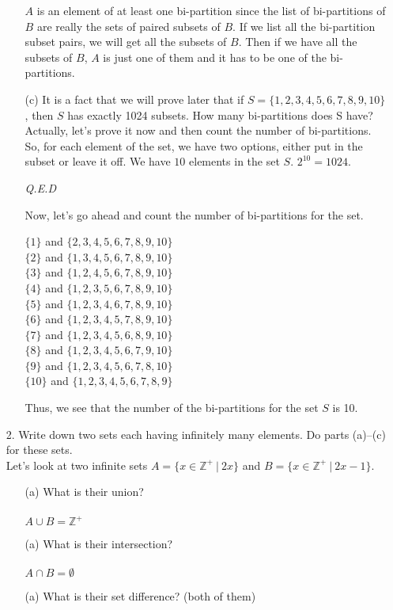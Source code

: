 \documentclass[12pt, a4paper]{article}                  %
\begin{document}
\begin{enumerate}
\begin{enumerate}
$A$ is an element of at least one bi-partition since the list of bi-partitions of $B$
are really the sets of paired subsets of $B$. If we list all the bi-partition subset pairs,
we will get all the subsets of $B$. Then if we have all the subsets of $B$, $A$ is just one
of them and it has to be one of the bi-partitions.
\\
\item[(c)]
It is a fact that we will prove later that if $S = \{1, 2, 3, 4, 5, 6, 7, 8, 9, 10 \}$, then $S$
has exactly 1024 subsets. How many bi-partitions does S have?\\

Actually, let's prove it now and then count the number of bi-partitions.\\
So, for each element of the set, we have two options, either put in the subset
or leave it off. We have $10$ elements in the set $S$. $2^{10} = 1024$.
\begin{flushright}
\textit{Q.E.D}
\end{flushright}
Now, let's go ahead and count the number of bi-partitions for the set.\\
\begin{center}
$\{1\}$ and $\{2,3,4,5,6,7,8,9,10\}$\\
$\{2\}$ and $\{1,3,4,5,6,7,8,9,10\}$\\
$\{3\}$ and $\{1,2,4,5,6,7,8,9,10\}$\\
$\{4\}$ and $\{1,2,3,5,6,7,8,9,10\}$\\
$\{5\}$ and $\{1,2,3,4,6,7,8,9,10\}$\\
$\{6\}$ and $\{1,2,3,4,5,7,8,9,10\}$\\
$\{7\}$ and $\{1,2,3,4,5,6,8,9,10\}$\\
$\{8\}$ and $\{1,2,3,4,5,6,7,9,10\}$\\
$\{9\}$ and $\{1,2,3,4,5,6,7,8,10\}$\\
$\{10\}$ and $\{1,2,3,4,5,6,7,8,9\}$\\
\end{center}
Thus, we see that the number of the bi-partitions for the set $S$ is 10.
\end{enumerate}
\item[2.]
Write down two sets each having infinitely many elements.
Do parts (a)--(c) for these sets.\\

Let's look at two infinite sets $A = \{x \in \mathbb{Z^+} \ \vert \ 2x \}$
and $B = \{x \in \mathbb{Z^+} \ \vert \ 2x - 1 \}$.

\begin{enumerate}
\item[(a)]
What is their union?\\
\\
$A \cup B = \mathbb{Z}^+$
\\
\item[(a)]
What is their intersection?\\
\\
$A \cap B = \emptyset$
\\
\item[(a)]
What is their set difference? (both of them)\\


\end{enumerate}
\end{enumerate}
\end{document}
